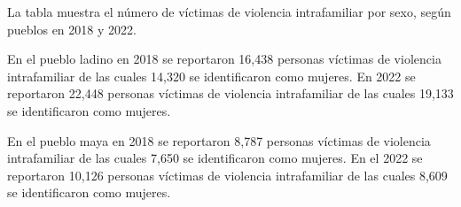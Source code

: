 La tabla muestra el número de víctimas de violencia intrafamiliar por sexo, según pueblos en 2018 y 2022. 

En el pueblo ladino en 2018 se reportaron 16,438 personas víctimas de violencia intrafamiliar de las cuales 14,320 se identificaron como mujeres. En 2022 se reportaron 22,448 personas víctimas de violencia intrafamiliar de las cuales 19,133 se identificaron como mujeres.

En el pueblo maya en 2018 se reportaron 8,787 personas víctimas de violencia intrafamiliar de las cuales 7,650 se identificaron como mujeres. En el 2022 se reportaron 10,126 personas víctimas de violencia intrafamiliar de las cuales 8,609 se identificaron como mujeres.